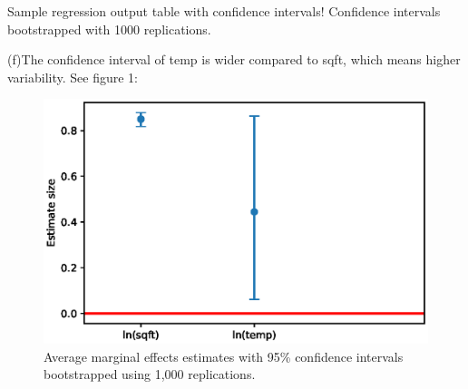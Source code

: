 \documentclass{article}
\begin{document}
\begin{table}[ht]
    \centering
    
    \caption{Sample regression output table with confidence intervals! Confidence intervals bootstrapped with 1000 replications.}
    \label{tab:sampleoutput}
\end{table}

(f)The confidence interval of temp is wider compared to sqft, which means higher variability. See figure 1:
\begin{figure}[ht]
    \centering
    \includegraphics[scale = 0.7]{samplebars.eps}
    \caption{Average marginal effects estimates with 95\% confidence intervals bootstrapped using 1,000 replications.}
    \label{fig:samplebars}
\end{figure}
\end{document}
